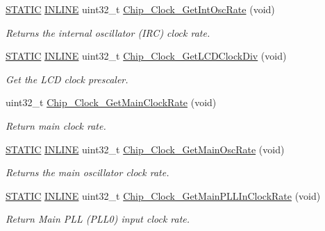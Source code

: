 \begin{DoxyCompactItemize}
\hyperlink{group__LPC__Types__Public__Macros_ga10b2d890d871e1489bb02b7e70d9bdfb}{S\+T\+A\+T\+IC} \hyperlink{group__LPC__Types__Public__Types_ga2eb6f9e0395b47b8d5e3eeae4fe0c116}{I\+N\+L\+I\+NE} uint32\+\_\+t \hyperlink{group__CLOCK__17XX__40XX_gaa8db0ad49f51bf5d6870181e77249c2b}{Chip\+\_\+\+Clock\+\_\+\+Get\+Int\+Osc\+Rate} (void)
\begin{DoxyCompactList}\small\item\em Returns the internal oscillator (I\+RC) clock rate. \end{DoxyCompactList}\item 
\hyperlink{group__LPC__Types__Public__Macros_ga10b2d890d871e1489bb02b7e70d9bdfb}{S\+T\+A\+T\+IC} \hyperlink{group__LPC__Types__Public__Types_ga2eb6f9e0395b47b8d5e3eeae4fe0c116}{I\+N\+L\+I\+NE} uint32\+\_\+t \hyperlink{group__CLOCK__17XX__40XX_gaa861b046872f8dff6f623ef7ba63fa80}{Chip\+\_\+\+Clock\+\_\+\+Get\+L\+C\+D\+Clock\+Div} (void)
\begin{DoxyCompactList}\small\item\em Get the L\+CD clock prescaler. \end{DoxyCompactList}\item 
uint32\+\_\+t \hyperlink{group__CLOCK__17XX__40XX_gaf5319079ca1531102c01860d05a69960}{Chip\+\_\+\+Clock\+\_\+\+Get\+Main\+Clock\+Rate} (void)
\begin{DoxyCompactList}\small\item\em Return main clock rate. \end{DoxyCompactList}\item 
\hyperlink{group__LPC__Types__Public__Macros_ga10b2d890d871e1489bb02b7e70d9bdfb}{S\+T\+A\+T\+IC} \hyperlink{group__LPC__Types__Public__Types_ga2eb6f9e0395b47b8d5e3eeae4fe0c116}{I\+N\+L\+I\+NE} uint32\+\_\+t \hyperlink{group__CLOCK__17XX__40XX_ga32ea9f95eed11d2bfa470b473232456e}{Chip\+\_\+\+Clock\+\_\+\+Get\+Main\+Osc\+Rate} (void)
\begin{DoxyCompactList}\small\item\em Returns the main oscillator clock rate. \end{DoxyCompactList}\item 
\hyperlink{group__LPC__Types__Public__Macros_ga10b2d890d871e1489bb02b7e70d9bdfb}{S\+T\+A\+T\+IC} \hyperlink{group__LPC__Types__Public__Types_ga2eb6f9e0395b47b8d5e3eeae4fe0c116}{I\+N\+L\+I\+NE} uint32\+\_\+t \hyperlink{group__CLOCK__17XX__40XX_gade97c5e68f4609663e247043b48949d9}{Chip\+\_\+\+Clock\+\_\+\+Get\+Main\+P\+L\+L\+In\+Clock\+Rate} (void)
\begin{DoxyCompactList}\small\item\em Return Main P\+LL (P\+L\+L0) input clock rate. \end{DoxyCompactList}\item 

\end{DoxyCompactItemize}
